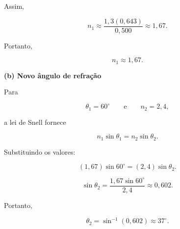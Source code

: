 \documentclass[12pt,a4paper]{article}
\begin{document}
Assim,



\[

n_1\approx\frac{1{,}3(0{,}643)}{0{,}500}

\approx 1{,}67.

\]



Portanto,



\[

\boxed{n_1 \approx 1{,}67}.

\]



\bigskip



\textbf{(b) Novo ângulo de refração}



Para



\[

\theta_1=60^\circ

\qquad\text{e}\qquad

n_2=2{,}4,

\]



a lei de Snell fornece



\[

n_1\sin\theta_1=n_2\sin\theta_2.

\]



Substituindo os valores:



\[

(1{,}67)\sin60^\circ

=

(2{,}4)\sin\theta_2.

\]



\[

\sin\theta_2

=

\frac{1{,}67\sin60^\circ}{2{,}4}

\approx 0{,}602.

\]



Portanto,



\[

\theta_2=\sin^{-1}(0{,}602)

\approx 37^\circ.

\]
\end{document}
